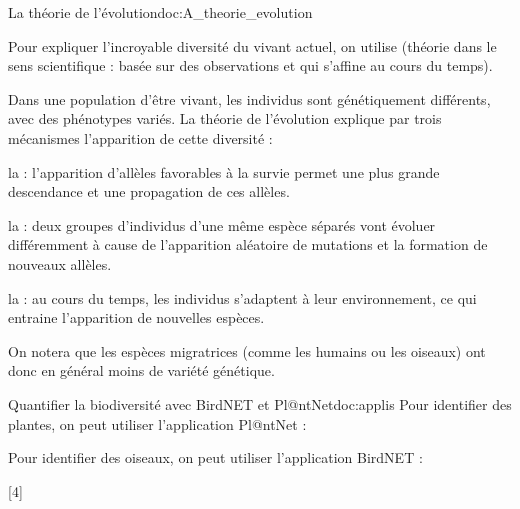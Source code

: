 \begin{doc}{La théorie de l'évolution}{doc:A_theorie_evolution}
  
  Pour expliquer l'incroyable diversité du vivant actuel, on utilise  (théorie dans le sens scientifique : basée sur des observations et qui s'affine au cours du temps). 

  Dans une population d'être vivant, les individus sont génétiquement différents, avec des phénotypes variés.
  La théorie de l'évolution explique par trois mécanismes l'apparition de cette diversité :

  \begin{listePoints}
    \item la  : l'apparition d'allèles favorables à la survie permet une plus grande descendance et une propagation de ces allèles.
    \item la  : deux groupes d'individus d'une même espèce séparés vont évoluer différemment à cause de l'apparition aléatoire de mutations et la formation de nouveaux allèles.
    \item la  : au cours du temps, les individus s'adaptent à leur environnement, ce qui entraine l'apparition de nouvelles espèces.
  \end{listePoints}

  On notera que les espèces migratrices (comme les humains ou les oiseaux) ont donc en général moins de variété génétique.
\end{doc}

\begin{doc}{Quantifier la biodiversité avec BirdNET et Pl@ntNet}{doc:applis}
  Pour identifier des plantes, on peut utiliser l'application Pl@ntNet :
  \begin{center}
  \end{center}

  Pour identifier des oiseaux, on peut utiliser l'application BirdNET :

  \begin{center}   
  \end{center}
\end{doc}


[4]

